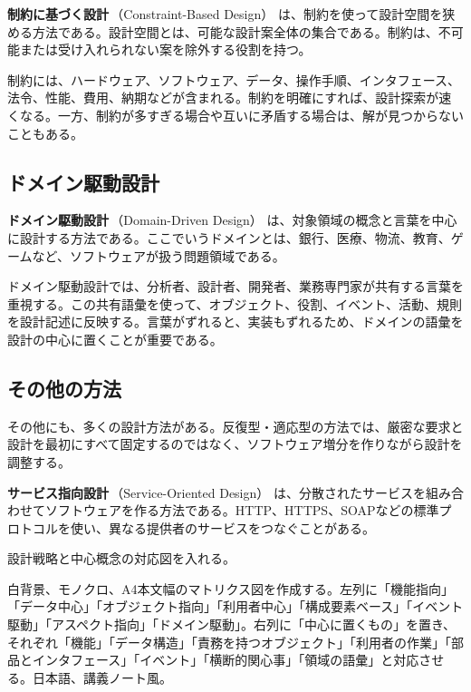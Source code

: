 \documentclass[10.5pt,a4paper]{ltjsarticle}
\newcommand{\term}[2]{\textbf{#1}\,（#2）}
\begin{document}
\term{制約に基づく設計}{Constraint-Based Design} は、制約を使って設計空間を狭める方法である。設計空間とは、可能な設計案全体の集合である。制約は、不可能または受け入れられない案を除外する役割を持つ。

制約には、ハードウェア、ソフトウェア、データ、操作手順、インタフェース、法令、性能、費用、納期などが含まれる。制約を明確にすれば、設計探索が速くなる。一方、制約が多すぎる場合や互いに矛盾する場合は、解が見つからないこともある。

\subsection{ドメイン駆動設計}

\term{ドメイン駆動設計}{Domain-Driven Design} は、対象領域の概念と言葉を中心に設計する方法である。ここでいうドメインとは、銀行、医療、物流、教育、ゲームなど、ソフトウェアが扱う問題領域である。

ドメイン駆動設計では、分析者、設計者、開発者、業務専門家が共有する言葉を重視する。この共有語彙を使って、オブジェクト、役割、イベント、活動、規則を設計記述に反映する。言葉がずれると、実装もずれるため、ドメインの語彙を設計の中心に置くことが重要である。

\subsection{その他の方法}

その他にも、多くの設計方法がある。反復型・適応型の方法では、厳密な要求と設計を最初にすべて固定するのではなく、ソフトウェア増分を作りながら設計を調整する。

\term{サービス指向設計}{Service-Oriented Design} は、分散されたサービスを組み合わせてソフトウェアを作る方法である。HTTP、HTTPS、SOAPなどの標準プロトコルを使い、異なる提供者のサービスをつなぐことがある。

\begin{todobox}
設計戦略と中心概念の対応図を入れる。
\end{todobox}
\begin{promptbox}
白背景、モノクロ、A4本文幅のマトリクス図を作成する。左列に「機能指向」「データ中心」「オブジェクト指向」「利用者中心」「構成要素ベース」「イベント駆動」「アスペクト指向」「ドメイン駆動」。右列に「中心に置くもの」を置き、それぞれ「機能」「データ構造」「責務を持つオブジェクト」「利用者の作業」「部品とインタフェース」「イベント」「横断的関心事」「領域の語彙」と対応させる。日本語、講義ノート風。
\end{promptbox}
\end{document}

